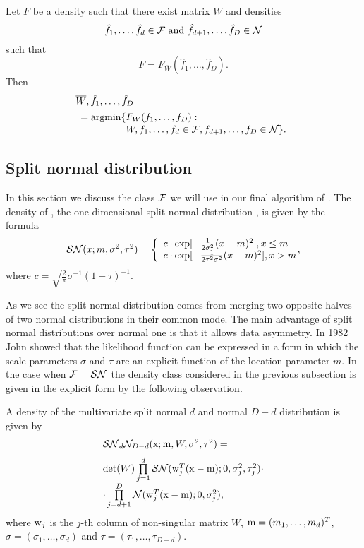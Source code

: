 \begin{theorem}
Let $F$ be a density such that there exist matrix $\overline W$ and densities
$$
\hat f_1,\ldots,\hat f_d \in \mathcal{F} \text{ and } \hat f_{d+1},\ldots,\hat f_D \in \mathcal{N}
$$
such that 
$$
F=F_{\overline W}(\hat f_1,\ldots,\hat f_D).
$$
Then
$$
\begin{array}{l}
\overline W,\hat f_1,\ldots,\hat f_D \\[1ex]
\begin{array}{l}
=\argmin \{F_{W}(f_1,\ldots,f_D): \\ 
\phantom{=\argmin \{}W, f_1,\ldots,\bar f_d \in \F,f_{d+1},\ldots,f_D \in \nor
\}.
\end{array}
\end{array}
$$
\end{theorem}

\subsection{Split normal distribution}


In this section we discuss the class $\mathcal{F}$ we will use in our final algorithm of \ICA{}. The density of \SN{}, the one-dimensional split normal distribution \cite{villani2006multivariate}, is given by the formula
$$
\mathcal{SN}(x;m,\sigma^2,\tau^2) = \left\{ \begin{array}{l}
c \cdot \exp[-\frac{1}{2\sigma^2}(x-m)^2], \textrm{$x\leq m$}\\
c \cdot \exp[-\frac{1}{2\tau^2\sigma^2}(x-m)^2], \textrm{$x>m$}\\
\end{array} \right. \!\!\!\!,
$$
where $c=\sqrt{\frac{2}{\pi}}\sigma^{-1}(1+\tau)^{-1}$. 


As we see the split normal distribution comes from merging two opposite halves of two normal distributions in their common mode. The main advantage of split normal distributions over normal one is that it allows data asymmetry. In 1982 John \cite{john1982three} showed that the likelihood function can be expressed in a  form in which the scale parameters $\sigma$ and $\tau$ are an explicit function of the location parameter $m$.
In the case when $\mathcal{F}=\mathcal{SN}$
the density class considered in the previous subsection is given in the
explicit form by the following observation.

\begin{observation}\label{def:GSN}
A density of the multivariate split normal $d$ and normal $D-d$ distribution is given by
$$
\begin{array}{l}
\mathcal{SN}_{d}\mathcal{N}_{D-d}(\mathrm{x}; \mathrm{m},W, \sigma^2,\tau^2)=\\[6pt]
\det(W) \prod \limits_{j=1}^{d} \mathcal{SN}(\mathrm{w}_j^T(\mathrm{x}-\mathrm{m});0,\sigma_j^2,\tau_j^2) \cdot\\[1ex]
\cdot \prod \limits_{j=d+1}^{D} \mathcal{N}(\mathrm{w}_j^T(\mathrm{x}-\mathrm{m});0,\sigma_j^2),
\end{array}
$$
where $\mathrm{w}_{j}$ is the $j$-th column of non-singular matrix $W$, $\mathrm{m} = (m_1, \ldots, m_d)^T$, $\sigma = (\sigma_{1},\ldots,\sigma_{d})$ and $\tau=(\tau_{1},\ldots,\tau_{D-d})$.
\end{observation}

